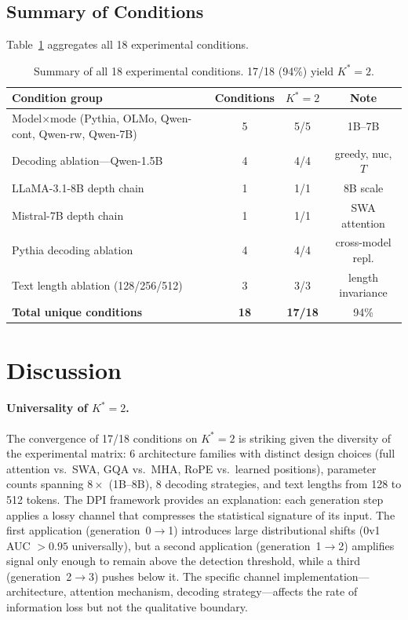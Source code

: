\documentclass[11pt]{article}
\newcommand{\Kstar}{K^{*}}
\begin{document}
\subsection{Summary of Conditions}
\label{sec:exp_summary}

Table~\ref{tab:summary} aggregates all 18 experimental conditions.

\begin{table}[t]
\centering
\caption{Summary of all 18 experimental conditions. 17/18 (94\%) yield $\Kstar\!=\!2$.}
\label{tab:summary}
\small
\begin{tabular}{p{5.5cm}ccc}
\toprule
\textbf{Condition group} & \textbf{Conditions} & $\Kstar\!=\!2$ & \textbf{Note} \\
\midrule
Model$\times$mode (Pythia, OLMo, Qwen-cont, Qwen-rw, Qwen-7B) & 5 & 5/5 & 1B--7B \\
Decoding ablation---Qwen-1.5B & 4 & 4/4 & greedy, nuc, $T$ \\
LLaMA-3.1-8B depth chain & 1 & 1/1 & 8B scale \\
Mistral-7B depth chain & 1 & 1/1 & SWA attention \\
Pythia decoding ablation & 4 & 4/4 & cross-model repl. \\
Text length ablation (128/256/512) & 3 & 3/3 & length invariance \\
\midrule
\textbf{Total unique conditions} & \textbf{18} & \textbf{17/18} & 94\% \\
\bottomrule
\end{tabular}
\end{table}

\section{Discussion}
\label{sec:discussion}

\paragraph{Universality of $\Kstar\!=\!2$.}
The convergence of 17/18 conditions on $\Kstar\!=\!2$ is striking given the diversity of the experimental matrix: 6 architecture families with distinct design choices (full attention vs.\ SWA, GQA vs.\ MHA, RoPE vs.\ learned positions), parameter counts spanning $8\times$ (1B--8B), 8 decoding strategies, and text lengths from 128 to 512 tokens.
The DPI framework provides an explanation: each generation step applies a lossy channel that compresses the statistical signature of its input.
The first application (generation~0$\to$1) introduces large distributional shifts (0v1 AUC $> 0.95$ universally), but a second application (generation~1$\to$2) amplifies signal only enough to remain above the detection threshold, while a third (generation~2$\to$3) pushes below it.
The specific channel implementation---architecture, attention mechanism, decoding strategy---affects the rate of information loss but not the qualitative boundary.
\end{document}
